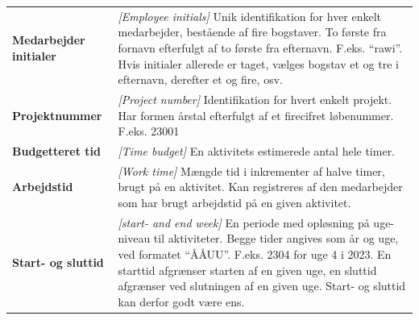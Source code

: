 \begin{table}[H]
\begin{tabular}{>{\bfseries}l p{}}
        Medarbejder initialer & \textit{[Employee initials]} Unik identifikation for hver enkelt medarbejder, bestående af fire bogstaver. To første fra fornavn efterfulgt af to første fra efternavn. F.eks. ``rawi''. Hvis initialer allerede er taget, vælges bogstav et og tre i efternavn, derefter et og fire, osv.                                     \\
        Projektnummer         & \textit{[Project number]} Identifikation for hvert enkelt projekt. Har formen årstal efterfulgt af et firecifret løbenummer. F.eks. 23001                                                                                                                                                                                      \\
        Budgetteret tid       & \textit{[Time budget]} En aktivitets estimerede antal hele timer.                                                                                                                                                                                                                                                              \\
        Arbejdstid            & \textit{[Work time]} Mængde tid i inkrementer af halve timer, brugt på en aktivitet. Kan registreres af den medarbejder som har brugt arbejdstid på en given aktivitet.                                                                                                                                                        \\
        Start- og sluttid     & \textit{[start- and end week]} En periode med opløsning på uge-niveau til aktiviteter. Begge tider angives som år og uge, ved formatet ``ÅÅUU''. F.eks. 2304 for uge 4 i 2023. En starttid afgrænser starten af en given uge, en sluttid afgrænser ved slutningen af en given uge. Start- og sluttid kan derfor godt være ens.
    \end{tabular}
\end{table}\newpage
